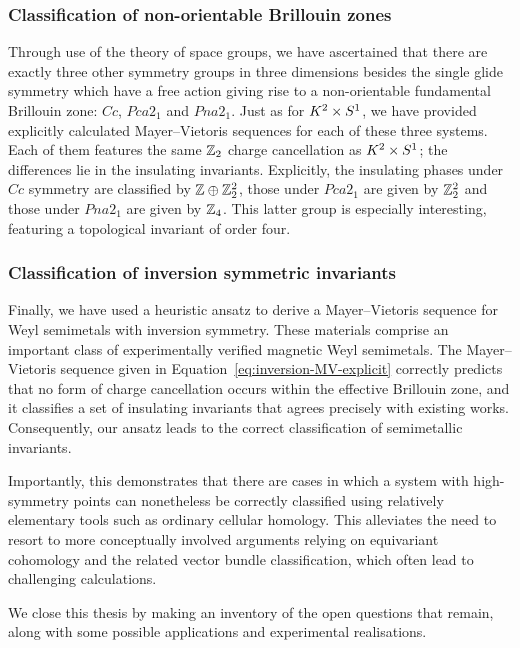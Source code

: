 \subsubsection{Classification of non-orientable Brillouin zones}

Through use of the theory of space groups, we have ascertained that there are exactly three other symmetry groups in three dimensions besides the single glide symmetry which have a free action giving rise to a non-orientable fundamental Brillouin zone: $Cc$, $Pca2_1$ and $Pna2_1$. Just as for $K^2\times S^1$, we have provided explicitly calculated Mayer--Vietoris sequences for each of these three systems. Each of them features the same $\mathbb{Z}_2$ charge cancellation as $K^2\times S^1$; the differences lie in the insulating invariants. Explicitly, the insulating phases under $Cc$ symmetry are classified by $\mathbb{Z}\oplus\mathbb{Z}_2^2$, those under $Pca2_1$ are given by $\mathbb{Z}_2^2$ and those under $Pna2_1$ are given by $\mathbb{Z}_4$. This latter group is especially interesting, featuring a topological invariant of order four.

\subsubsection{Classification of inversion symmetric invariants}

Finally, we have used a heuristic ansatz to derive a Mayer--Vietoris sequence for Weyl semimetals with inversion symmetry. These materials comprise an important class of experimentally verified magnetic Weyl semimetals. The Mayer--Vietoris sequence given in Equation~\eqref{eq:inversion-MV-explicit} correctly predicts that no form of charge cancellation occurs within the effective Brillouin zone, and it classifies a set of insulating invariants that agrees precisely with existing works. Consequently, our ansatz leads to the correct classification of semimetallic invariants.

Importantly, this demonstrates that there are cases in which a system with high-symmetry points can nonetheless be correctly classified using relatively elementary tools such as ordinary cellular homology. %
This alleviates the need to resort to more conceptually involved arguments relying on equivariant cohomology and the related vector bundle classification, which often lead to challenging calculations.


\label{sec:outlook}

We close this thesis by making an inventory of the open questions that remain, along with some possible applications and experimental realisations.

